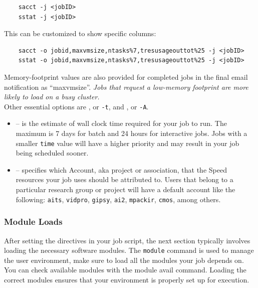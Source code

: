 \begin{verbatim}
    sacct -j <jobID>
    sstat -j <jobID>
\end{verbatim}

\noindent This can be customized to show specific columns:
\begin{verbatim}
    sacct -o jobid,maxvmsize,ntasks%7,tresusageouttot%25 -j <jobID>
    sstat -o jobid,maxvmsize,ntasks%7,tresusageouttot%25 -j <jobID>
\end{verbatim}

\noindent Memory-footprint values are also provided for completed jobs in the final
email notification as ``maxvmsize''.
\emph{Jobs that request a low-memory footprint are more likely to load on a busy
cluster.}\\

\noindent Other essential options are , or \verb|-t|, and , or \verb|-A|.
\begin{itemize}
    \item {} -- is the estimate of wall clock time required for your job to run. 
    The maximum is 7 days for batch and 24 hours for interactive jobs. 
    Jobs with a smaller \texttt{time} value will have a higher priority and may result in your job being scheduled sooner. 

    \item {} -- specifies which Account, aka project or association, 
    that the Speed resources your job uses should be attributed to. Users that belong to 
    a particular research group or project will have a default account like the following: 
    \texttt{aits},
    \texttt{vidpro},
    \texttt{gipsy},
    \texttt{ai2},
    \texttt{mpackir},
    \texttt{cmos}, among others.
\end{itemize}

\subsubsection{Module Loads}
\label{sect:modules}

After setting the directives in your job script, the next section typically involves loading 
the necessary software modules. The \texttt{module} command is used to manage the user environment, 
make sure to load all the modules your job depends on. You can check available modules with the 
module avail command. Loading the correct modules ensures that your environment is properly 
set up for execution.

